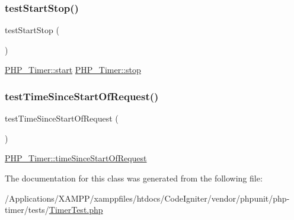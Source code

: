 \subsubsection{\texorpdfstring{test\+Start\+Stop()}{testStartStop()}}
{\footnotesize\ttfamily test\+Start\+Stop (\begin{DoxyParamCaption}{ }\end{DoxyParamCaption})}

\mbox{\hyperlink{class_p_h_p___timer_a146085d0f3a9d17bdcd7f3d4081d8c0d}{P\+H\+P\+\_\+\+Timer\+::start}}  \mbox{\hyperlink{class_p_h_p___timer_a00c3c0c2fc53579e9d1ac28a52623450}{P\+H\+P\+\_\+\+Timer\+::stop}} \mbox{\label{class_p_h_p___timer_test_afe94bd24909637b92820b291932f6a2a}} 
\subsubsection{\texorpdfstring{test\+Time\+Since\+Start\+Of\+Request()}{testTimeSinceStartOfRequest()}}
{\footnotesize\ttfamily test\+Time\+Since\+Start\+Of\+Request (\begin{DoxyParamCaption}{ }\end{DoxyParamCaption})}

\mbox{\hyperlink{class_p_h_p___timer_a47261cd60577fea5503d5994e45b6811}{P\+H\+P\+\_\+\+Timer\+::time\+Since\+Start\+Of\+Request}} 

The documentation for this class was generated from the following file\+:\begin{DoxyCompactItemize}
\item 
/\+Applications/\+X\+A\+M\+P\+P/xamppfiles/htdocs/\+Code\+Igniter/vendor/phpunit/php-\/timer/tests/\mbox{\hyperlink{_timer_test_8php}{Timer\+Test.\+php}}\end{DoxyCompactItemize}
